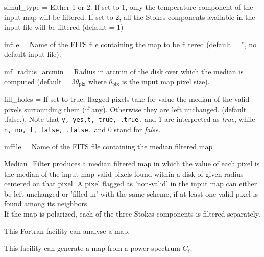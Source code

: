 \begin{qualifiers}
  \begin{qulistwide}{} %
%
    \item[{simul\_type = }]%
 Either 1 or 2. If set to 1, only the temperature component of the
      input map will be filtered. If set to 2, all the Stokes components available
      in the input file will be filtered (default = 1)
%
    \item[{infile = }]%
 Name of the FITS file containing the map to be filtered
      (default = '', no default input file).
%
    \item[{mf\_radius\_arcmin = }]%
 Radius in arcmin of the disk over which the
      median is computed (default = $3\theta_{\textrm{pix}}$ where $\theta_{\textrm{pix}}$
      is the input map pixel size).
%
    \item[{fill\_holes = }]%
 If set to true, flagged pixels take for value the median of
      the valid pixels surrounding them (if any). Otherwise they are left
      unchanged.
      (default = .false.). Note that {\tt y, yes,t, true, .true.} and 1 are
      interpreted as {\em true}, while {\tt n, no, f, false, .false.} and 0 stand
      for {\em false}.
%
    \item[{mffile = }]%
 Name of the FITS file containing the median filtered map
%
  \end{qulistwide}
\end{qualifiers}

\begin{codedescription}
{%
Median\_Filter produces a median filtered map in which the value of each pixel
is the median of the input map valid pixels found within a disk of given
  radius centered on that pixel. A pixel flagged as 'non-valid' in the input map
  can either be left unchanged or 'filled in' with the same scheme, if at
  least one valid pixel is found among its neighbors. \\
If the map is polarized, each of the three Stokes components is filtered separately.
}
\end{codedescription}

\begin{support}
  \begin{sulist}{} %
  \item[\htmlref{anafast}{fac:anafast}] This \healpix Fortran facility can
     	       analyse a \healpix map.
  \item[\htmlref{synfast}{fac:synfast}] This \healpix facility can generate a
  \healpix map from a power spectrum $C_\ell$.
		
  \end{sulist}
\end{support}

